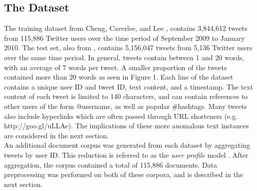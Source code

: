 \documentclass{acm_proc_article-sp}
\begin{document}
\subsection{The Dataset}
\hspace*{5mm}The training dataset from Cheng, Caverlee, and Lee \cite{cheng2010content}, contains 3,844,612 tweets from 115,886 Twitter users over the time period of September 2009 to January 2010. The test set, also from \cite{cheng2010content}, contains 5,156,047 tweets from 5,136 Twitter users over the same time period. In general, tweets contain between 1 and 20 words, with an average of 7 words per tweet. A smaller proportion of the tweets contained more than 20 words as seen in Figure 1. Each line of the dataset contains a unique user ID and tweet ID, text content, and a timestamp. The text content of each tweet is limited to 140 characters, and can contain references to other users of the form @username, as well as popular \#hashtags. Many tweets also include hyperlinks which are often passed through URL shorteners (e.g. http://goo.gl/uLLAe). The implications of these more anomalous text instances are considered in the next section.\\
\hspace*{5mm}An additional document corpus was generated from each dataset by aggregating tweets by user ID. This reduction is referred to as the \textit{user profile} model \cite{hong2010empirical}. After aggregation, the corpus contained a total of 115,886 documents. Data preprocessing was performed on both of these corpora, and is described in the next section.
 
\end{document}
